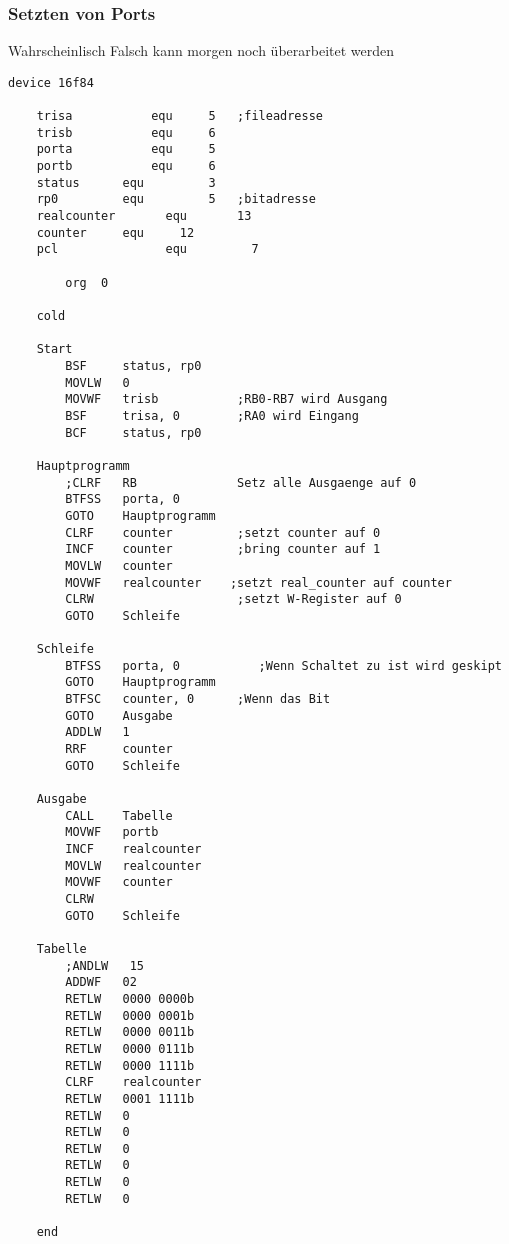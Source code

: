 \subsubsection*{Setzten von Ports}
Wahrscheinlisch Falsch kann morgen noch überarbeitet werden
\begin{lstlisting}[language=avr]
    device 16f84

    trisa			equ		5	;fileadresse
    trisb			equ		6 
    porta			equ		5
    portb			equ		6
    status 		equ 		3
    rp0			equ 		5	;bitadresse
    realcounter	      equ 		13
    counter		equ		12
    pcl               equ         7
    
        org  0
    
    cold
    
    Start
        BSF     status, rp0     
        MOVLW   0
        MOVWF   trisb           ;RB0-RB7 wird Ausgang
        BSF     trisa, 0        ;RA0 wird Eingang
        BCF     status, rp0
    
    Hauptprogramm
        ;CLRF   RB              Setz alle Ausgaenge auf 0
        BTFSS   porta, 0           
        GOTO    Hauptprogramm
        CLRF    counter         ;setzt counter auf 0
        INCF    counter         ;bring counter auf 1
        MOVLW   counter
        MOVWF   realcounter    ;setzt real_counter auf counter
        CLRW                    ;setzt W-Register auf 0
        GOTO    Schleife
    
    Schleife
        BTFSS   porta, 0           ;Wenn Schaltet zu ist wird geskipt
        GOTO    Hauptprogramm
        BTFSC   counter, 0      ;Wenn das Bit 
        GOTO    Ausgabe
        ADDLW   1
        RRF     counter
        GOTO    Schleife
    
    Ausgabe
        CALL    Tabelle
        MOVWF   portb
        INCF    realcounter
        MOVLW   realcounter
        MOVWF   counter
        CLRW
        GOTO    Schleife
        
    Tabelle
        ;ANDLW   15
        ADDWF   02
        RETLW   0000 0000b
        RETLW   0000 0001b
        RETLW   0000 0011b
        RETLW   0000 0111b
        RETLW   0000 1111b
        CLRF    realcounter
        RETLW   0001 1111b	
        RETLW   0
        RETLW   0
        RETLW   0
        RETLW   0
        RETLW   0
        RETLW   0
    
    end

\end{lstlisting}
